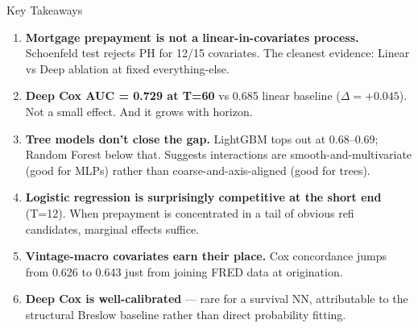 \documentclass[10pt,aspectratio=169]{beamer}
\begin{document}


\begin{frame}{Key Takeaways}

    \begin{enumerate}\itemsep4pt

        \item \textbf{Mortgage prepayment is not a linear-in-covariates process.}
              Schoenfeld test rejects PH for 12/15 covariates. The cleanest evidence:  Linear vs Deep ablation at fixed everything-else.

        \item \textbf{Deep Cox AUC = 0.729 at T=60} vs 0.685 linear baseline ($\Delta = +0.045$).  Not a small effect.  And it grows with horizon.

        \item \textbf{Tree models don't close the gap.}  LightGBM tops out at 0.68--0.69; Random Forest below that.  Suggests interactions are smooth-and-multivariate (good for MLPs) rather than coarse-and-axis-aligned (good for trees).

        \item \textbf{Logistic regression is surprisingly competitive at the short end} (T=12).  When prepayment is concentrated in a tail of obvious refi candidates, marginal effects suffice.

        \item \textbf{Vintage-macro covariates earn their place.}  Cox concordance jumps from 0.626 to 0.643 just from joining FRED data at origination.

        \item \textbf{Deep Cox is well-calibrated} --- rare for a survival NN, attributable to the structural Breslow baseline rather than direct probability fitting.

    \end{enumerate}

\end{frame}
\end{document}
